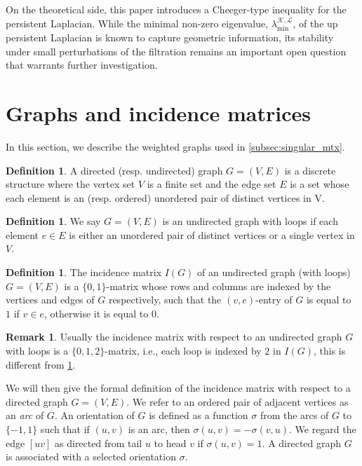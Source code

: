 \documentclass{article}
\theoremstyle{definition}
\newtheorem{definition}[theorem]{Definition}
\newtheorem{remark}[theorem]{Remark}
\newcommand{\KK}{\mathcal{K}}
\newcommand{\LL}{\mathcal{L}}
\begin{document}
On the theoretical side, this paper introduces a Cheeger-type inequality for the persistent Laplacian. While the minimal non-zero eigenvalue, $\lambda_{\mathrm{min}}^{\KK, \LL}$, of the up persistent Laplacian is known to capture geometric information, its stability under small perturbations of the filtration remains an important open question that warrants further investigation.


\FloatBarrier


\appendix

\section{Graphs and incidence matrices}
In this section,
we describe the weighted graphs used in \cref{subsec:singular_mtx}.

\begin{definition}
A directed (resp. undirected) graph $G=(V, E)$ is a discrete structure where the vertex set $V$ is a finite set and the edge set $E$ is a set whose each element is an (resp. ordered) unordered pair of distinct vertices in V.
\end{definition}

\begin{definition}
We say $G=(V, E)$ is an undirected graph with loops if each element $e\in E$ is either an unordered pair of distinct vertices or a single vertex in $V$.
\end{definition}

\begin{definition}\label{def:incd_mtx_undir}
The incidence matrix $I(G)$ of an undirected graph (with loops) $G=(V, E)$ is a $\{0, 1\}$-matrix whose rows and columns are indexed by the vertices and edges of $G$ respectively,
such that the $(v, e)$-entry of $G$ is equal to $1$ if $v\in e$, 
otherwise it is equal to $0$.
\end{definition}

\begin{remark}
Usually the incidence matrix with respect to an undirected graph $G$ with loops is a $\{0, 1, 2\}$-matrix,
i.e., 
each loop is indexed by $2$ in $I(G)$,
this is different from \cref{def:incd_mtx_undir}.
\end{remark}

We will then give the formal definition of the incidence matrix with respect to a directed graph $G=(V, E)$.
We refer to an ordered pair of adjacent vertices as an \emph{arc} of $G$.
An orientation of $G$ is defined as a function $\sigma$ from the arcs of $G$ to $\{-1, 1\}$ such that if $(u, v)$ is an arc,
then $\sigma(u, v)=-\sigma(v, u)$.
We regard the edge $[uv]$ as directed from tail $u$ to head $v$ if $\sigma(u, v)=1$.
A directed graph $G$ is associated with a selected orientation $\sigma$.
\end{document}
